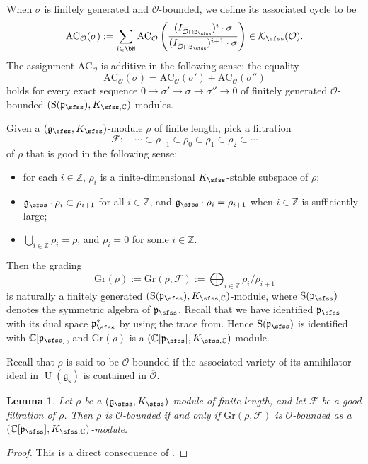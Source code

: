 \documentclass[12pt,a4paper]{amsart}
\newcommand{\CF}{{\mathcal {F}}}
\newcommand{\CK}{{\mathcal {K}}}
\newcommand{\CO}{{\mathcal {O}}}
\newcommand{\oS}{\operatorname{S}}
\newcommand{\oU}{\operatorname{U}}
\newcommand{\g}{\mathfrak g}
\newcommand{\p}{\mathfrak p}
\newcommand{\Z}{\mathbb{Z}}
\newcommand{\be}{\begin {equation}}
\newcommand{\ee}{\end {equation}}
\numberwithin{equation}{section}
\newtheorem{lem}[thm]{Lemma}
\theoremstyle{remark}
\begin{document}
 When $\sigma$ is finitely generated and $\CO$-bounded, we define its associated cycle to be
\[
  \mathrm{AC}_\CO(\sigma):=\sum_{i\in \bN}\mathrm{AC}_\CO\left(\frac{(I_{\overline \CO\cap \p_\sfss})^i\cdot \sigma}{(I_{\overline \CO\cap \p_\sfss})^{i+1}\cdot \sigma}\right)\in  \CK_\sfss(\CO).
\]
The assignment $\mathrm{AC}_\CO$ is additive in the following sense: the equality
\[
 \mathrm{AC}_\CO(\sigma)= \mathrm{AC}_\CO(\sigma')+ \mathrm{AC}_\CO(\sigma'')
\]
holds for every exact sequence
$0\rightarrow \sigma'\rightarrow \sigma\rightarrow \sigma''\rightarrow 0$ of finitely generated $\CO$-bounded $(\oS(\p_{\sfss}), K_{\sfss, \C})$-modules.


Given a $(\g_\sfss, K_{\sfss})$-module $\rho$ of finite length, pick a filtration
\be\label{goodf}
\CF:\quad  \cdots\subset \rho_{-1}\subset \rho_0\subset \rho_1\subset \rho_2\subset \cdots
\ee
of $\rho$ that is good in the following sense:
\begin{itemize}
\item for each $i\in \Z$, $\rho_i$ is a finite-dimensional  $K_{\sfss}$-stable subspace of $\rho$;
\item $\g_\sfss \cdot \rho_i\subset \rho_{i+1}$ for all $i\in \Z$, and $\g_\sfss \cdot \rho_i=\rho_{i+1}$ when  $i\in \Z$ is sufficiently large;
\item $\bigcup_{i\in \Z} \rho_i=\rho$, and $\rho_i=0$ for some $i\in \Z$.
\end{itemize}
Then the grading
\[
  \mathrm{Gr}(\rho):= \mathrm{Gr}(\rho,\CF):=\bigoplus_{i\in \Z} \rho_i/\rho_{i+1}
\]
is naturally a finitely generated  $(\oS(\p_{\sfss}), K_{\sfss, \C})$-module, where $\oS(\p_{\sfss})$ denotes the symmetric algebra of $\p_\sfss$. Recall that we have identified $\p_\sfss$ with its dual space $\p_\sfss^*$ by using the trace from. Hence $\oS(\p_{\sfss})$ is identified with $\C[\p_\sfss]$, and $\mathrm{Gr}(\rho)$ is a $(\C[\p_{\sfss}], K_{\sfss, \C})$-module.


Recall that $\rho$ is said to be $\CO$-bounded if the associated variety of its annihilator ideal in $\oU(\g_\mathsf s)$ is contained in  $\overline \CO$.

\begin{lem}\label{l62}
Let $\rho$ be a $(\g_\sfss, K_{\sfss})$-module  of finite length,  and let $\CF$ be a  good filtration of $\rho$. Then $\rho$ is $\CO$-bounded if and only if $\mathrm{Gr}(\rho, \CF)$ is $\CO$-bounded as a $(\C[\p_{\sfss}], K_{\sfss, \C})$-module.
\end{lem}
\begin{proof}
This is a direct consequence of   \cite[Theorem 8.4]{Vo89}.
\end{proof}
\end{document}
